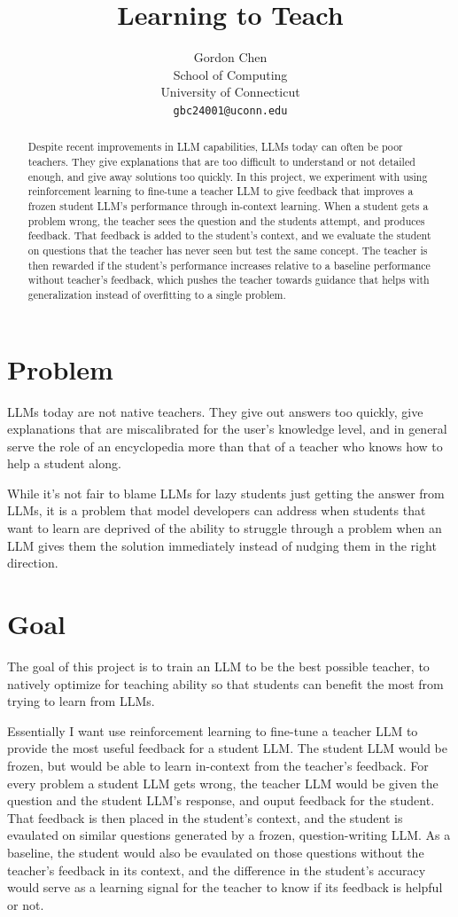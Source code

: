 \documentclass{article}
\title{Learning to Teach}
\author{
Gordon Chen\\
School of Computing\\
University of Connecticut\\
\texttt{gbc24001@uconn.edu}\\
}
\begin{document}
\maketitle

\begin{abstract}
Despite recent improvements in LLM capabilities, LLMs today can often be poor teachers.
They give explanations that are too difficult to understand or not detailed enough, and give away
solutions too quickly.
In this project, we experiment with using reinforcement learning to fine-tune a teacher LLM to give
feedback that improves a frozen student LLM's performance through in-context learning.
When a student gets a problem wrong, the teacher sees the question and the students attempt,
and produces feedback. That feedback is added to the student's context, and we evaluate the student
on questions that the teacher has never seen but test the same concept.
The teacher is then rewarded if the student's performance increases relative to a baseline performance
without teacher's feedback, which pushes the teacher towards guidance that helps with generalization
instead of overfitting to a single problem.
\end{abstract}

\section{Problem}
LLMs today are not native teachers. They give out answers too quickly, give explanations that are
miscalibrated for the user's knowledge level, and in general serve the role of an encyclopedia more
than that of a teacher who knows how to help a student along.

While it's not fair to blame LLMs for lazy students just getting the answer from LLMs, it is a problem
that model developers can address when students that want to learn are deprived of the ability
to struggle through a problem when an LLM gives them the solution immediately instead of nudging them
in the right direction.

\section{Goal}
The goal of this project is to train an LLM to be the best possible teacher, to natively optimize
for teaching ability so that students can benefit the most from trying to learn from LLMs.

Essentially I want use reinforcement learning to fine-tune a teacher LLM to provide the most useful
feedback for a student LLM. The student LLM would be frozen, but would be able to learn in-context from
the teacher's feedback. For every problem a student LLM gets wrong, the teacher LLM would be given
the question and the student LLM's response, and ouput feedback for the student. That feedback is then placed
in the student's context, and the student is evaulated on similar questions generated by a frozen,
question-writing LLM. As a baseline, the student would also be evaulated on those questions without
the teacher's feedback in its context, and the difference in the student's accuracy would serve as a learning
signal for the teacher to know if its feedback is helpful or not.
\end{document}
